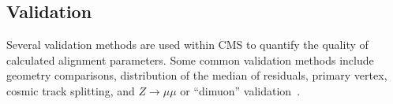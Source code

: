 









\subsection{Validation}

Several validation methods are used within CMS to quantify the quality of calculated alignment parameters. Some common validation methods include geometry comparisons, distribution of the median of residuals, primary vertex, cosmic track splitting, and $Z\to\mu\mu$ or ``dimuon'' validation~\cite{2022166795}.

